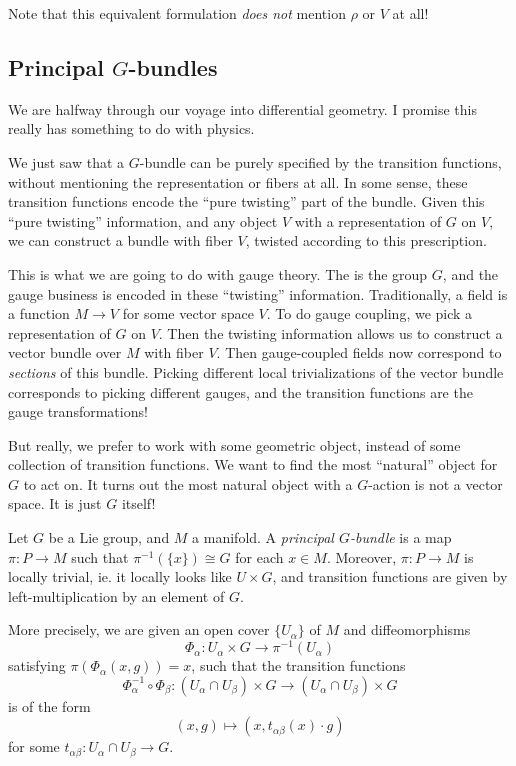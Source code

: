 \documentclass[a4paper]{article}
\begin{document}
Note that this equivalent formulation \emph{does not} mention $\rho$ or $V$ at all!

\subsection{Principal \texorpdfstring{$G$}{G}-bundles}
We are halfway through our voyage into differential geometry. I promise this really has something to do with physics.

We just saw that a $G$-bundle can be purely specified by the transition functions, without mentioning the representation or fibers at all. In some sense, these transition functions encode the ``pure twisting'' part of the bundle. Given this ``pure twisting'' information, and any object $V$ with a representation of $G$ on $V$, we can construct a bundle with fiber $V$, twisted according to this prescription.

This is what we are going to do with gauge theory. The  is the group $G$, and the gauge business is encoded in these ``twisting'' information. Traditionally, a field is a function $M \to V$ for some vector space $V$. To do gauge coupling, we pick a representation of $G$ on $V$. Then the twisting information allows us to construct a vector bundle over $M$ with fiber $V$. Then gauge-coupled fields now correspond to \emph{sections} of this bundle. Picking different local trivializations of the vector bundle corresponds to picking different gauges, and the transition functions are the gauge transformations!

But really, we prefer to work with some geometric object, instead of some collection of transition functions. We want to find the most ``natural'' object for $G$ to act on. It turns out the most natural object with a $G$-action is not a vector space. It is just $G$ itself!

\begin{defi}
  Let $G$ be a Lie group, and $M$ a manifold. A \emph{principal $G$-bundle} is a map $\pi: P \to M$ such that $\pi^{-1}(\{x\}) \cong G$ for each $x \in M$. Moreover, $\pi: P \to M$ is locally trivial, ie. it locally looks like $U \times G$, and transition functions are given by left-multiplication by an element of $G$.

  More precisely, we are given an open cover $\{U_\alpha\}$ of $M$ and diffeomorphisms
  \[
    \Phi_\alpha: U_\alpha \times G \to \pi^{-1}(U_\alpha)
  \]
  satisfying $\pi(\Phi_\alpha(x, g)) = x$, such that the transition functions
  \[
    \Phi_\alpha^{-1} \circ \Phi_\beta: (U_\alpha \cap U_\beta) \times G \to (U_\alpha \cap U_\beta) \times G
  \]
  is of the form
  \[
    (x, g) \mapsto (x, t_{\alpha\beta}(x) \cdot g)
  \]
  for some $t_{\alpha\beta}: U_\alpha \cap U_\beta \to G$.
\end{defi}
\end{document}
